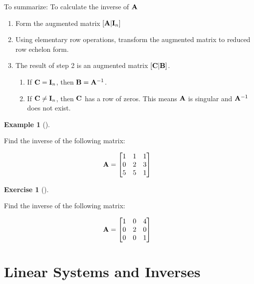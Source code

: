 \documentclass[
  letterpaper,
]{book}
\theoremstyle{definition}
\theoremstyle{definition}
\newtheorem{example}{Example}[chapter]
\theoremstyle{plain}
\theoremstyle{definition}
\newtheorem{exercise}{Exercise}[chapter]
\theoremstyle{plain}
\theoremstyle{plain}
\theoremstyle{remark}
\begin{document}
To summarize: To calculate the inverse of \({\bf A}\)

\begin{enumerate}
\def\labelenumi{\arabic{enumi}.}
\item
  Form the augmented matrix \([ {\bf A} | {\bf I}_n]\)
\item
  Using elementary row operations, transform the augmented matrix to
  reduced row echelon form.
\item
  The result of step 2 is an augmented matrix \([ {\bf C} | {\bf B} ]\).

  \begin{enumerate}
  \def\labelenumii{\alph{enumii}.}
  \item
    If \({\bf C}={\bf I}_n\), then \({\bf B}={\bf A}^{-1}\).
  \item
    If \({\bf C}\ne{\bf I}_n\), then \(\bf C\) has a row of zeros. This
    means \({\bf A}\) is singular and \({\bf A}^{-1}\) does not exist.
  \end{enumerate}
\end{enumerate}

\leavevmode{}%
\begin{example}[]\label{exm-inverse}

Find the inverse of the following matrix:

\[{\bf A}=\begin{bmatrix} 1&1&1\\0&2&3\\5&5&1 \end{bmatrix}\]

\end{example}

\leavevmode{}%
\begin{exercise}[]\label{exr-inverse1}

Find the inverse of the following matrix:

\[{\bf A}=\begin{bmatrix} 1&0&4\\0&2&0\\0&0&1 \end{bmatrix}\]

\end{exercise}

\hypertarget{linear-systems-and-inverses}{%
\section{Linear Systems and
Inverses}\label{linear-systems-and-inverses}}
\end{document}
